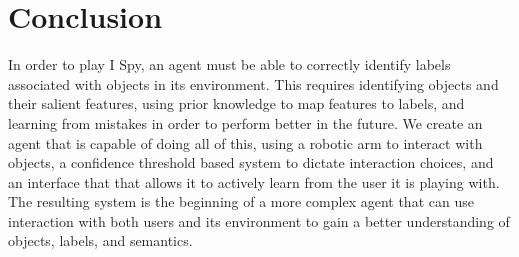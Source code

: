 \documentclass[11pt]{article}
\newcommand{\xxx}[1]{{\bf \color{red} #1}}
\begin{document}
\section{Conclusion}
In order to play I Spy, an agent must be able to correctly identify labels
associated with objects in its environment. This requires identifying objects
and their salient features, using prior knowledge to map features to labels, and
learning from mistakes in order to perform better in the future. We create an
agent that is capable of doing all of this, using a robotic arm to interact with
objects, a confidence threshold based system to dictate interaction choices, and
an interface that that allows it to actively learn from the user it is playing
with. The resulting system is the beginning of a more complex agent that can
use interaction with both users and its environment to gain a better understanding
of objects, labels, and semantics.




\end{document}
